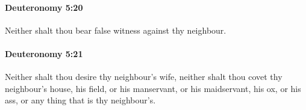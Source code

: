 		\paragraph{Deuteronomy 5:20} %
			\label{DEUTERONOMY-5-20}

			Neither shalt thou bear false witness against thy neighbour.


		\paragraph{Deuteronomy 5:21} %
			\label{DEUTERONOMY-5-21}

			Neither shalt thou desire thy neighbour's wife, neither shalt thou covet thy neighbour's house, his field, or his manservant, or his maidservant, his ox, or his ass, or any thing that is thy neighbour's.


